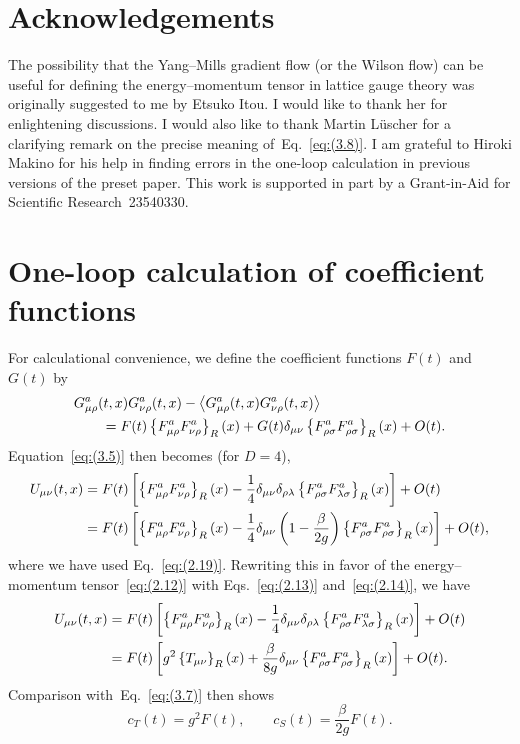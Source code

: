 \section*{Acknowledgements}
The possibility that the Yang--Mills gradient flow (or the Wilson flow) can be
useful for defining the energy--momentum tensor in lattice gauge theory was
originally suggested to me by Etsuko Itou. I would like to thank her for
enlightening discussions. I would also like to thank Martin L\"uscher for a
clarifying remark on the precise meaning of~Eq.~\eqref{eq:(3.8)}.
I am grateful to Hiroki Makino for his help in finding errors in the one-loop
calculation in previous versions of the preset paper.
This work is supported in part by a Grant-in-Aid for Scientific
Research~23540330.

\appendix

\section{One-loop calculation of coefficient functions}
\label{sec:5}
For calculational convenience, we define the coefficient functions $F(t)$
and~$G(t)$ by
\begin{align}
   &G_{\mu\rho}^a(t,x)G_{\nu\rho}^a(t,x)
   -\left\langle G_{\mu\rho}^a(t,x)G_{\nu\rho}^a(t,x)\right\rangle
\notag\\
   &\qquad{}
   =F(t)\left\{F_{\mu\rho}^aF_{\nu\rho}^a\right\}_R(x)
   +G(t)\delta_{\mu\nu}\left\{F_{\rho\sigma}^aF_{\rho\sigma}^a\right\}_R(x)
   +O(t).
\label{eq:(5.1)}
\end{align}
Equation~\eqref{eq:(3.5)} then becomes (for $D=4$),
\begin{align}
   U_{\mu\nu}(t,x)
   &=F(t)\left[
   \left\{F_{\mu\rho}^aF_{\nu\rho}^a\right\}_R(x)
   -\frac{1}{4}\delta_{\mu\nu}
   \delta_{\rho\lambda}\left\{F_{\rho\sigma}^aF_{\lambda\sigma}^a\right\}_R(x)
   \right]
   +O(t)
\notag\\
   &=F(t)\left[
   \left\{F_{\mu\rho}^aF_{\nu\rho}^a\right\}_R(x)
   -\frac{1}{4}\delta_{\mu\nu}
   \left(1-\frac{\beta}{2g}\right)
   \left\{F_{\rho\sigma}^aF_{\rho\sigma}^a\right\}_R(x)
   \right]
   +O(t),
\label{eq:(5.2)}
\end{align}
where we have used Eq.~\eqref{eq:(2.19)}. Rewriting this in favor of the
energy--momentum tensor~\eqref{eq:(2.12)} with Eqs.~\eqref{eq:(2.13)}
and~\eqref{eq:(2.14)}, we have
\begin{align}
   U_{\mu\nu}(t,x)
   &=F(t)\left[
   \left\{F_{\mu\rho}^aF_{\nu\rho}^a\right\}_R(x)
   -\frac{1}{4}\delta_{\mu\nu}
   \delta_{\rho\lambda}\left\{F_{\rho\sigma}^aF_{\lambda\sigma}^a\right\}_R(x)
   \right]
   +O(t)
\notag\\
   &=F(t)\left[
   g^2\left\{T_{\mu\nu}\right\}_R(x)
   +\frac{\beta}{8g}\delta_{\mu\nu}
   \left\{F_{\rho\sigma}^aF_{\rho\sigma}^a\right\}_R(x)
   \right]
   +O(t).
\label{eq:(5.3)}
\end{align}
Comparison with~Eq.~\eqref{eq:(3.7)} then shows
\begin{equation}
   c_T(t)=g^2F(t),\qquad c_S(t)=\frac{\beta}{2g}F(t).
\label{eq:(5.4)}
\end{equation}


